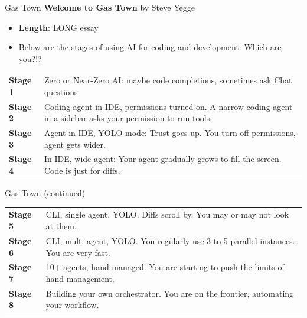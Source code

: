 \documentclass[aspectratio=169]{beamer}
\begin{document}
\begin{frame}{Gas Town}
\textbf{Welcome to Gas Town} by Steve Yegge
\vspace{0.3cm}

\begin{itemize}
    \item \textbf{Length}: LONG essay
    \item Below are the stages of using AI for coding and development. Which are you?!?
\end{itemize}

\vspace{0.2cm}
{\small
\begin{tabular}{p{} p{}}
\textbf{Stage 1} & Zero or Near-Zero AI: maybe code completions, sometimes ask Chat questions \\[0.15cm]
\textbf{Stage 2} & Coding agent in IDE, permissions turned on. A narrow coding agent in a sidebar asks your permission to run tools. \\[0.15cm]
\textbf{Stage 3} & Agent in IDE, YOLO mode: Trust goes up. You turn off permissions, agent gets wider. \\[0.15cm]
\textbf{Stage 4} & In IDE, wide agent: Your agent gradually grows to fill the screen. Code is just for diffs.
\end{tabular}
}

\end{frame}

\begin{frame}{Gas Town (continued)}

{\small
\begin{tabular}{p{} p{}}
\textbf{Stage 5} & CLI, single agent. YOLO. Diffs scroll by. You may or may not look at them. \\[0.15cm]
\textbf{Stage 6} & CLI, multi-agent, YOLO. You regularly use 3 to 5 parallel instances. You are very fast. \\[0.15cm]
\textbf{Stage 7} & 10+ agents, hand-managed. You are starting to push the limits of hand-management. \\[0.15cm]
\textbf{Stage 8} & Building your own orchestrator. You are on the frontier, automating your workflow.
\end{tabular}
}

\end{frame}
\end{document}
